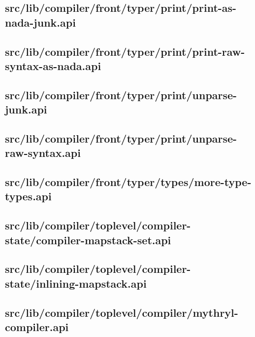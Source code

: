 \subsection{src/lib/compiler/front/typer/print/print-as-nada-junk.api}


\subsection{src/lib/compiler/front/typer/print/print-raw-syntax-as-nada.api}


\subsection{src/lib/compiler/front/typer/print/unparse-junk.api}


\subsection{src/lib/compiler/front/typer/print/unparse-raw-syntax.api}


\subsection{src/lib/compiler/front/typer/types/more-type-types.api}


\subsection{src/lib/compiler/toplevel/compiler-state/compiler-mapstack-set.api}


\subsection{src/lib/compiler/toplevel/compiler-state/inlining-mapstack.api}


\subsection{src/lib/compiler/toplevel/compiler/mythryl-compiler.api}



